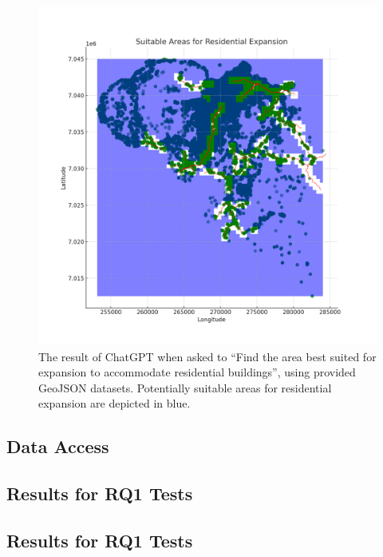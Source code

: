 \begin{figure}
    \centering
    \includegraphics[width=\textwidth]{../figs/residential_expansion_areas_map.png}
    \caption{The result of ChatGPT when asked to \enquote{Find the area best suited for expansion to accommodate residential buildings}, using provided GeoJSON datasets. Potentially suitable areas for residential expansion  are depicted in blue.}
    \label{fig:planning-plot-from-geojson}
\end{figure}

\subsection{Data Access}


\subsection[Results for RQ1 Tests]{Results for RQ1 Tests }
\subsection[Results for RQ1 Tests]{Results for RQ1 Tests }








